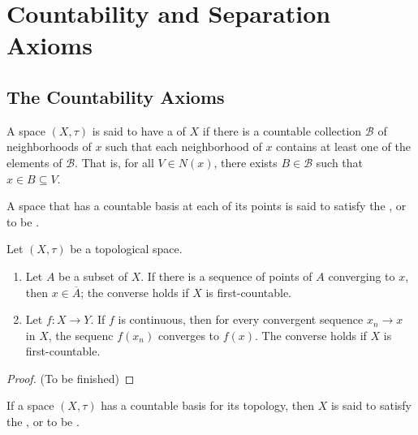 %
%
%
\chapter{Countability and Separation Axioms}
\label{CountSep} %

\section{The Countability Axioms}

\begin{definition}
    A space $(X,\tau)$ is said to have a  of $X$ if there is a countable collection $\mathcal{B}$ of neighborhoods of $x$ such that each neighborhood of $x$ contains at least one of the elements of $\mathcal{B}$. That is, for all $V \in N(x)$, there exists $B \in \mathcal{B}$ such that $x \in B \subseteq V$.


    A space that has a countable basis at each of its points is said to satisfy the , or to be .
\end{definition}

\begin{theorem}
    Let $(X,\tau)$ be a topological space. \begin{enumerate}
        \item Let $A$ be a subset of $X$. If there is a sequence of points of $A$ converging to $x$, then $x \in \overline{A}$; the converse holds if $X$ is first-countable.
        \item Let $f:X\rightarrow Y$. If $f$ is continuous, then for every convergent sequence $x_n\rightarrow x$ in $X$, the sequenc $f(x_n)$ converges to $f(x)$. The converse holds if $X$ is first-countable.
    \end{enumerate}
\end{theorem}
\begin{proof}
    (To be finished)
\end{proof}


\begin{definition}
    If a space $(X,\tau)$ has a countable basis for its topology, then $X$ is said to satisfy the , or to be .
\end{definition}

